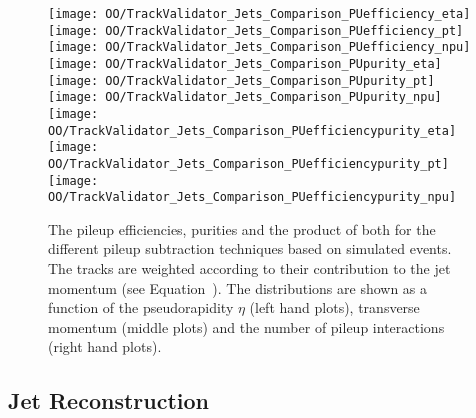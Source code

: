 \begin{figure}[Ht]
  \centering
  \texttt{[image: OO/TrackValidator\_Jets\_Comparison\_PUefficiency\_eta]}
  \texttt{[image: OO/TrackValidator\_Jets\_Comparison\_PUefficiency\_pt]}
  \texttt{[image: OO/TrackValidator\_Jets\_Comparison\_PUefficiency\_npu]}
  \\
  \texttt{[image: OO/TrackValidator\_Jets\_Comparison\_PUpurity\_eta]}
  \texttt{[image: OO/TrackValidator\_Jets\_Comparison\_PUpurity\_pt]}
  \texttt{[image: OO/TrackValidator\_Jets\_Comparison\_PUpurity\_npu]}
  \\
  \texttt{[image: OO/TrackValidator\_Jets\_Comparison\_PUefficiencypurity\_eta]}
  \texttt{[image: OO/TrackValidator\_Jets\_Comparison\_PUefficiencypurity\_pt]}
  \texttt{[image: OO/TrackValidator\_Jets\_Comparison\_PUefficiencypurity\_npu]}
  \caption[Pileup efficiencies, purities and their product of the different pileup subtraction techniques based on simulated \ttbar events with jet weight]{The pileup efficiencies, purities and the product of both for the different pileup subtraction techniques based on simulated \ttbar events. The tracks are weighted according to their contribution to the jet momentum (see Equation~). The distributions are shown as a function of the pseudorapidity $\eta$ (left hand plots), transverse momentum (middle plots) and the number of pileup interactions (right hand plots). \label{plot:OOJetsTVCompTTPileup}}
\end{figure}


\clearpage{}

\subsection{Jet Reconstruction \label{sec:OOJetsPtResponse}}

